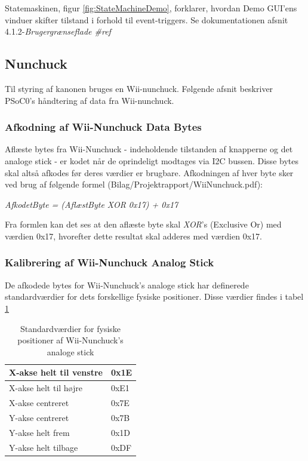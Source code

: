 \noindent Statemaskinen, figur \ref{fig:StateMachineDemo}, forklarer, hvordan Demo GUI'ens vinduer skifter tilstand i forhold til event-triggers. Se dokumentationen afsnit 4.1.2-\textit{Brugergrænseflade \#ref} 


\subsection{Nunchuck}
Til styring af kanonen bruges en Wii-nunchuck. Følgende afsnit beskriver PSoC0's håndtering af data fra Wii-nunchuck.

\subsubsection{Afkodning af Wii-Nunchuck Data Bytes}
Aflæste bytes fra Wii-Nunchuck - indeholdende tilstanden af knapperne og det analoge stick - er kodet når de oprindeligt modtages via I2C bussen. Disse bytes skal altså afkodes før deres værdier er brugbare. Afkodningen af hver byte sker ved brug af følgende formel (Bilag/Projektrapport/WiiNunchuck.pdf): \newline

\noindent \textit{AfkodetByte = (AflæstByte XOR 0x17) + 0x17} \newline 

\noindent Fra formlen kan det ses at den aflæste byte skal \textit{XOR}'s (Exclusive Or) med værdien 0x17, hvorefter dette resultat skal adderes med værdien 0x17.

\subsubsection{Kalibrering af Wii-Nunchuck Analog Stick}
De afkodede bytes for Wii-Nunchuck's analoge stick har definerede standardværdier for dets forskellige fysiske positioner. Disse værdier findes i tabel \ref{tabel:WiiNunchuckStickPositioner}

\begin{table}[H]
	\centering
	\begin{tabular}{|l|l|}
		\hline
		X-akse helt til venstre & 0x1E \\ \hline
		X-akse helt til højre   & 0xE1 \\ \hline
		X-akse centreret        & 0x7E \\ \hline
		Y-akse centreret        & 0x7B \\ \hline
		Y-akse helt frem        & 0x1D \\ \hline
		Y-akse helt tilbage     & 0xDF \\ \hline
	\end{tabular}
	\caption{Standardværdier for fysiske positioner af Wii-Nunchuck's analoge stick}
	\label{tabel:WiiNunchuckStickPositioner}
\end{table}

